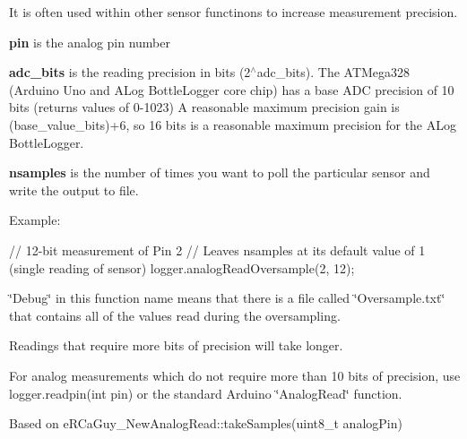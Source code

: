 It is often used within other sensor functinons to increase measurement precision.

{\bfseries pin} is the analog pin number

{\bfseries adc\+\_\+bits} is the reading precision in bits (2$^\wedge$adc\+\_\+bits). The A\+T\+Mega328 (Arduino Uno and A\+Log Bottle\+Logger core chip) has a base A\+DC precision of 10 bits (returns values of 0-\/1023) A reasonable maximum precision gain is (base\+\_\+value\+\_\+bits)+6, so 16 bits is a reasonable maximum precision for the A\+Log Bottle\+Logger.

{\bfseries nsamples} is the number of times you want to poll the particular sensor and write the output to file.

Example\+: 
\begin{DoxyCode}
\textcolor{comment}{// 12-bit measurement of Pin 2}
\textcolor{comment}{// Leaves nsamples at its default value of 1 (single reading of sensor)}
logger.analogReadOversample(2, 12);
\end{DoxyCode}


\char`\"{}\+Debug\char`\"{} in this function name means that there is a file called \char`\"{}\+Oversample.\+txt\char`\"{} that contains all of the values read during the oversampling.

Readings that require more bits of precision will take longer.

For analog measurements which do not require more than 10 bits of precision, use logger.\+readpin(int pin) or the standard Arduino \char`\"{}\+Analog\+Read\char`\"{} function.

Based on e\+R\+Ca\+Guy\+\_\+\+New\+Analog\+Read\+::take\+Samples(uint8\+\_\+t analog\+Pin)
